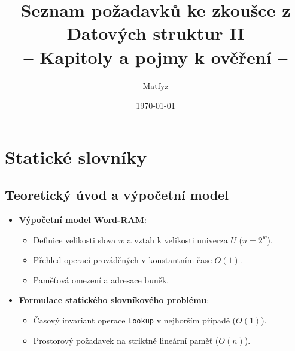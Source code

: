 \documentclass[11pt,a4paper]{article}
\begin{document}
\title{Seznam požadavků ke zkoušce z Datových struktur II\\-- Kapitoly a pojmy k ověření --}
\author{Matfyz}
\date{\today}
\maketitle

\section{Statické slovníky}

\subsection{Teoretický úvod a výpočetní model}
\begin{itemize}
    \item \textbf{Výpočetní model Word-RAM}:
    \begin{itemize}
        \item Definice velikosti slova $w$ a vztah k velikosti univerza $U$ ($u = 2^w$).
        \item Přehled operací prováděných v konstantním čase $O(1)$.
        \item Paměťová omezení a adresace buněk.
    \end{itemize}
    \item \textbf{Formulace statického slovníkového problému}:
    \begin{itemize}
        \item Časový invariant operace \texttt{Lookup} v nejhorším případě ($O(1)$).
        \item Prostorový požadavek na striktně lineární paměť ($O(n)$).
    \end{itemize}
\end{itemize}
\end{document}
